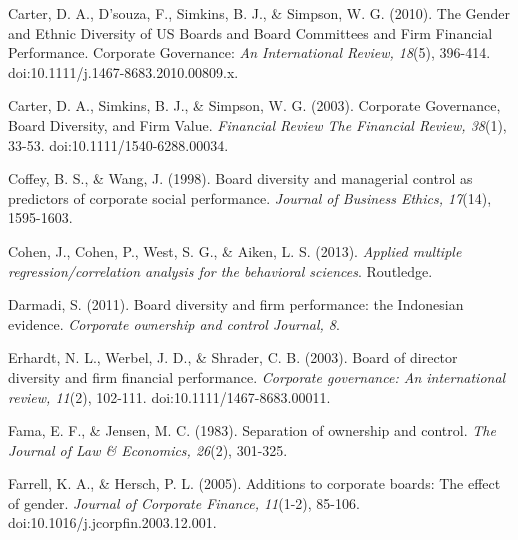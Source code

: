 \begin{thebibliography}{99\kern\bibindent}
\begin{singlespace}
Carter, D. A., D'souza, F., Simkins, B. J., \& Simpson, W. G. (2010). The Gender and Ethnic Diversity of US Boards and Board Committees and Firm Financial Performance. Corporate Governance: \emph{An International Review, 18}(5), 396-414. doi:10.1111/j.1467-8683.2010.00809.x.
\end{singlespace}

\begin{singlespace}
Carter, D. A., Simkins, B. J., \& Simpson, W. G. (2003). Corporate Governance, Board Diversity, and Firm Value. \emph{Financial Review The Financial Review, 38}(1), 33-53. doi:10.1111/1540-6288.00034.
\end{singlespace}

\begin{singlespace}
Coffey, B. S., \& Wang, J. (1998). Board diversity and managerial control as predictors of corporate social performance. \emph{Journal of Business Ethics, 17}(14), 1595-1603.
\end{singlespace}

\begin{singlespace}
Cohen, J., Cohen, P., West, S. G., \& Aiken, L. S. (2013). \emph{Applied multiple regression/correlation analysis for the behavioral sciences}. Routledge.
\end{singlespace}

\begin{singlespace}
Darmadi, S. (2011). Board diversity and firm performance: the Indonesian evidence. \emph{Corporate ownership and control Journal, 8}.
\end{singlespace}

\begin{singlespace}
Erhardt, N. L., Werbel, J. D., \& Shrader, C. B. (2003). Board of director diversity and firm financial performance. \emph{Corporate governance: An international review, 11}(2), 102-111. doi:10.1111/1467-8683.00011.
\end{singlespace}

\begin{singlespace}
Fama, E. F., \& Jensen, M. C. (1983). Separation of ownership and control. \emph{The Journal of Law \& Economics, 26}(2), 301-325.
\end{singlespace}

\begin{singlespace}
Farrell, K. A., \& Hersch, P. L. (2005). Additions to corporate boards: The effect of gender. \emph{Journal of Corporate Finance, 11}(1-2), 85-106. doi:10.1016/j.jcorpfin.2003.12.001.
\end{singlespace}


\end{thebibliography}
